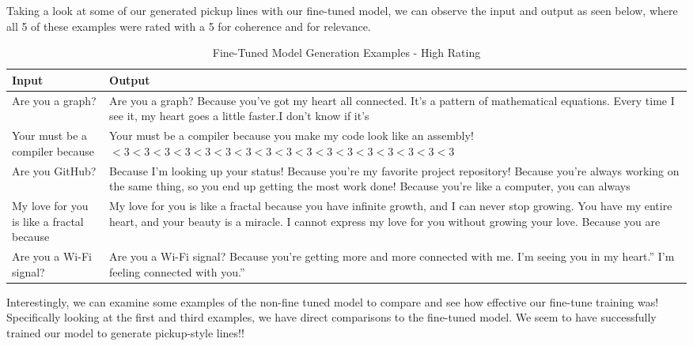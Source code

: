 \documentclass[12pt,reqno]{amsart}
\theoremstyle{plain}
\theoremstyle{definition}
\theoremstyle{remark}
\begin{document}
Taking a look at some of our generated pickup lines with our fine-tuned model, we can observe the input and output as seen below, where all 5 of these examples were rated with a 5 for coherence and for relevance.

\begin{table}[H]
    \centering
\begin{tabularx}{0.8\textwidth} { 
  | >{\raggedright\arraybackslash}X 
  | >{\raggedright\arraybackslash}X  | }
  \hline
 \textbf{Input}  & \textbf{Output}  \\
 \hline
 Are you a graph? & Are you a graph? Because you’ve got my heart all connected. It's a pattern of mathematical equations. Every time I see it, my heart goes a little faster.I don't know if it’s \\
 \hline
 Your must be a compiler because  & Your must be a compiler because you make my code look like an assembly! $<3 <3 <3 <3 <3 <3 <3 <3 <3 <3 <3 <3 <3 <3 <3 <3 <3$   \\
 \hline
 Are you GitHub?  & Because I'm looking up your status! Because you're my favorite project repository! Because you're always working on the same thing, so you end up getting the most work done! Because you're like a computer, you can always  \\
  \hline
 My love for you is like a fractal because  & My love for you is like a fractal because you have infinite growth, and I can never stop growing. You have my entire heart, and your beauty is a miracle. I cannot express my love for you without growing your love. Because you are \\
  \hline
 Are you a Wi-Fi signal?  & Are you a Wi-Fi signal? Because you’re getting more and more connected with me. I’m seeing you in my heart.” ‪I’m feeling connected with you.”  \\
  \hline
\end{tabularx}
    \caption{Fine-Tuned Model Generation Examples - High Rating}
    \label{tab:my_label}
\end{table}

Interestingly, we can examine some examples of the non-fine tuned model to compare and see how effective our fine-tune training was! Specifically looking at the first and third examples, we have direct comparisons to the fine-tuned model. We seem to have successfully trained our model to generate pickup-style lines!!
\end{document}
